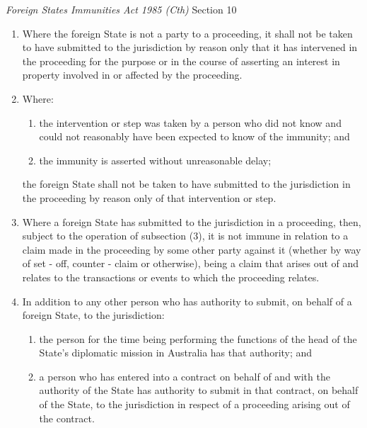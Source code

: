 \begin{statutedetails}{\textit{Foreign States Immunities Act 1985 (Cth)} Section 10}
\begin{enumerate}[label=(\arabic*)]
\begin{enumerate}[label=(\alph*)]
            \item it has made an application for costs; or
            \item it has intervened, or has taken a step, in the proceeding for the purpose or in the course of asserting immunity.
        \end{enumerate}
        \item Where the foreign State is not a party to a proceeding, it shall not be taken to have submitted to the jurisdiction by reason only that it has intervened in the proceeding for the purpose or in the course of asserting an interest in property involved in or affected by the proceeding.
        \item Where:
        \begin{enumerate}[label=(\alph*)]
            \item the intervention or step was taken by a person who did not know and could not reasonably have been expected to know of the immunity; and
            \item the immunity is asserted without unreasonable delay;
        \end{enumerate}
        the foreign State shall not be taken to have submitted to the jurisdiction in the proceeding by reason only of that intervention or step.
        \item Where a foreign State has submitted to the jurisdiction in a proceeding, then, subject to the operation of subsection (3), it is not immune in relation to a claim made in the proceeding by some other party against it (whether by way of set - off, counter - claim or otherwise), being a claim that arises out of and relates to the transactions or events to which the proceeding relates.
        \item In addition to any other person who has authority to submit, on behalf of a foreign State, to the jurisdiction:
        \begin{enumerate}[label=(\alph*)]
            \item the person for the time being performing the functions of the head of the State's diplomatic mission in Australia has that authority; and
            \item a person who has entered into a contract on behalf of and with the authority of the State has authority to submit in that contract, on behalf of the State, to the jurisdiction in respect of a proceeding arising out of the contract.
        \end{enumerate}
    \end{enumerate}
\end{statutedetails}

